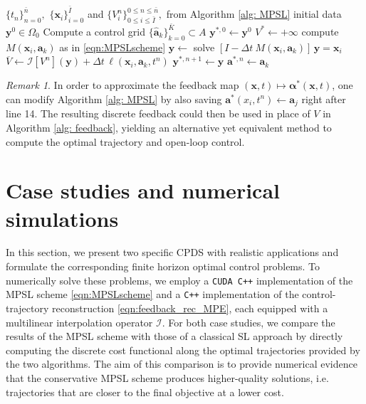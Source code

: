\documentclass[10pt]{article}
\theoremstyle{remark}
\newtheorem{remark}{Remark}[section]
\theoremstyle{definition}
\theoremstyle{remark}
\begin{document}
\begin{algorithm}
\caption{Optimal control and trajectory reconstruction algorithm} \label{alg: feedback}
    \begin{algorithmic}[1]
        \Require $\{t_n\}_{n=0}^{\bar{n}},$ $\{\bm{x}_i\}_{i=0}^{\bar{I}}$ and $\{V_i^n\}_{0\leq i \leq \bar{I}}^{0\leq n \leq \bar{n}},$ from Algorithm \ref{alg: MPSL}
        \Require initial data $\bm{y}^0 \in \Omega_0$
        \State Compute a control grid $\{\bm{\hat{a}}_k\}_{k=0}^{\bar{K}} \subset A$ %
        \State $\bm{y}^{*,0} \gets \bm{y}^0$
            \State $V^* \gets +\infty$
                \State compute $M(\bm{x}_i, \bm{a}_k )$ as in \eqref{eqn:MPSLscheme}
                \State $\bm{y} \gets$ solve $[I-\Delta t \ M(\bm{x}_i,\bm{a}_k )]\, \bm{y} = \bm{x}_i$
                \State $\overline{V} \gets \mathcal{I} \left[ V^n\right](\bm{y}) + \Delta t \,\ell(\bm{x}_i, \bm{a}_k ,t^n)$
                    \State $\bm{y}^{*,n+1} \gets \bm{y}$ %
                    \State $\bm{a}^{*,n} \gets \bm{a}_k$ %
                \EndIf
            \EndFor
        \EndFor
    \end{algorithmic}
\end{algorithm}

\begin{remark}
In order to approximate the feedback map $(\bm{x},t) \mapsto \bm{\alpha}^*(\bm{x},t)$, one can modify Algorithm \ref{alg: MPSL} by also saving $\bm{a}^*(x_i,t^n) \gets \bm{a}_j$ right after line 14. The resulting discrete feedback could then be used in place of $V$ in Algorithm \ref{alg: feedback}, yielding an alternative yet equivalent method to compute the optimal trajectory and open-loop control.
\end{remark}


\section{Case studies and numerical simulations}\label{sec:numerical}

In this section, we present two specific CPDS with realistic applications and formulate the corresponding finite horizon optimal control problems. To numerically solve these problems, we employ a \texttt{CUDA C++} implementation of the MPSL scheme \eqref{eqn:MPSLscheme} and a \texttt{C++} implementation of the control-trajectory reconstruction \eqref{eqn:feedback_rec_MPE}, each equipped with a multilinear interpolation operator $\mathcal{I}$. For both case studies, we compare the results of the MPSL scheme with those of a classical SL approach by directly computing the discrete cost functional along the optimal trajectories provided by the two algorithms. The aim of this comparison is to provide numerical evidence that the conservative MPSL scheme produces higher-quality solutions, i.e. trajectories that are closer to the final objective at a lower cost. 
\end{document}
